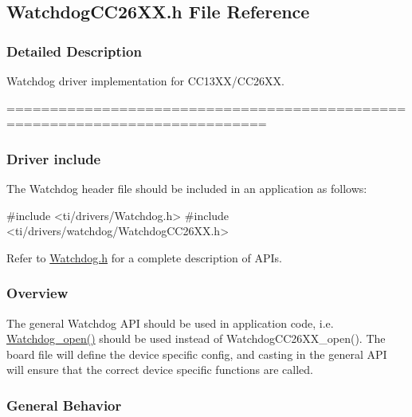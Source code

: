 \subsection{Watchdog\+C\+C26\+X\+X.\+h File Reference}
\label{_watchdog_c_c26_x_x_8h}


\subsubsection{Detailed Description}
Watchdog driver implementation for C\+C13\+X\+X/\+C\+C26\+X\+X. 

============================================================================

\subsubsection*{Driver include}

The Watchdog header file should be included in an application as follows\+: 
\begin{DoxyCode}
\textcolor{preprocessor}{#include <ti/drivers/Watchdog.h>}
\textcolor{preprocessor}{#include <ti/drivers/watchdog/WatchdogCC26XX.h>}
\end{DoxyCode}


Refer to \hyperlink{_watchdog_8h}{Watchdog.\+h} for a complete description of A\+P\+Is.

\subsubsection*{Overview}

The general Watchdog A\+P\+I should be used in application code, i.\+e. \hyperlink{_watchdog_8h_aa5ce656aa6d5199e1efdb4ca2cd9fb7c}{Watchdog\+\_\+open()} should be used instead of Watchdog\+C\+C26\+X\+X\+\_\+open(). The board file will define the device specific config, and casting in the general A\+P\+I will ensure that the correct device specific functions are called.

\subsubsection*{General Behavior}

